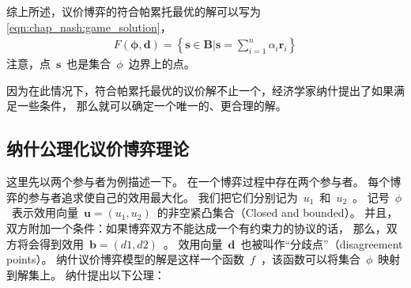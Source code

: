 综上所述，议价博弈的符合帕累托最优的解可以写为\eqref{eqn:chap_nash:game_solution}，
\begin{align}
    F(\mathbf{\phi},\mathbf{d}) = \left\{ \mathbf{s} \in \mathbf{B} \big \vert \mathbf{s} = \sum_{i=1}^n \alpha_i \mathbf{r}_i \right\}
    \label{eqn:chap_nash:game_solution}
\end{align}
注意，点~$\mathbf{s}$~也是集合~$\phi$~边界上的点。

因为在此情况下，符合帕累托最优的议价解不止一个，经济学家纳什提出了如果满足一些条件，
那么就可以确定一个唯一的、更合理的解\cite{Nash_1950}。

\subsection{纳什公理化议价博弈理论}
这里先以两个参与者为例描述一下。
在一个博弈过程中存在两个参与者。
每个博弈的参与者追求使自己的效用最大化。
我们把它们分别记为~$u_1$~和~$u_2$~。
记号~$\phi$~表示效用向量~$\mathbf{u}=(u_1, u_2)$~的非空紧凸集合（Closed and bounded）。
并且，双方附加一个条件：如果博弈双方不能达成一个有约束力的协议的话，
那么，双方将会得到效用~$\mathbf{b}=(d1, d2)$~。
效用向量~$\mathbf{d}$~也被叫作“分歧点”（disagreement points）。
纳什议价博弈模型的解是这样一个函数~$f$~，该函数可以将集合~$\phi$~映射到解集上。
纳什提出以下公理：


